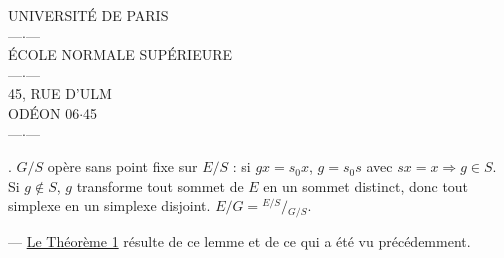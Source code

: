 
\begin{center}
UNIVERSITÉ DE PARIS\\
---$\cdot$---\\
ÉCOLE NORMALE SUPÉRIEURE\\
---$\cdot$---\\
45, RUE D'ULM\\
ODÉON 06$\cdot$45\\
---$\cdot$---
\end{center}

. $G/S$ opère sans point fixe sur $E/S$ : si $gx=s_0x$, $g=s_0s$ avec $sx=x\Rightarrow g\in S$. Si $g\notin S$, $g$ transforme tout sommet de $E$ en un sommet distinct, donc tout simplexe en un simplexe disjoint. $E/G={}^{E/S}\!/\!{}_{G/S}$.

--- \uline{Le Théorème 1}  résulte de ce lemme et de ce qui a été vu précédemment.



